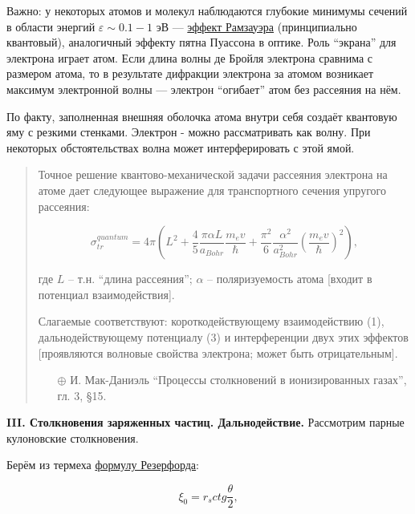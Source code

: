 \documentclass[10pt, a4paper]{article}
\begin{document}
Важно: у некоторых атомов и молекул наблюдаются глубокие минимумы сечений в области энергий $\varepsilon \sim 0.1-1$ эВ --- \uline{эффект Рамзауэра} \cite{raizer} (принципиально квантовый), аналогичный эффекту пятна Пуассона в оптике. Роль ``экрана'' для электрона играет атом. Если длина волны де Бройля электрона сравнима с размером атома, то в результате дифракции электрона за атомом возникает максимум электронной волны — электрон ``огибает'' атом без рассеяния на нём.

По факту, заполненная внешняя оболочка атома внутри себя создаёт квантовую яму с резкими стенками. Электрон - можно рассматривать как волну. При некоторых обстоятельствах волна может интерферировать с этой ямой. 

\begin{quotation}
	
	Точное решение квантово-механической задачи рассеяния электрона на атоме дает следующее выражение для транспортного сечения упругого рассеяния:
	
	\begin{equation*}
		\sigma_{tr}^{quantum} = 4\pi \left(L^{2}+\frac{4}{5}\frac{\pi \alpha L}{a_{Bohr}}\frac{m_ev}{\hbar}+\frac{\pi^{2}}{6}\frac{\alpha^{2}}{a_{Bohr}^{2}}\left( \frac{m_ev}{\hbar}\right) ^{2} \right), 
	\end{equation*}
	
	где $L$ -- т.н. ``длина рассеяния''; $\alpha$ -- поляризуемость атома [входит в потенциал взаимодействия].
	
	Слагаемые соответствуют: короткодействующему взаимодействию (1), дальнодействующему потенциалу (3) и интерференции двух этих эффектов [проявляются волновые свойства электрона; может быть отрицательным].
	
	\begin{itemize}
		\item[$\oplus$] И. Мак-Даниэль ``Процессы столкновений в ионизированных газах'', гл. 3, \S 15.
	\end{itemize}
	
\end{quotation}

{\bfseries \large III. Столкновения заряженных частиц. Дальнодействие.} Рассмотрим парные кулоновские столкновения.

Берём из термеха \uline{формулу Резерфорда}:

\begin{equation} \label{eq:Rutherford}
	\xi_0 = r_s ctg\frac{\theta}{2},
\end{equation}
\end{document}
